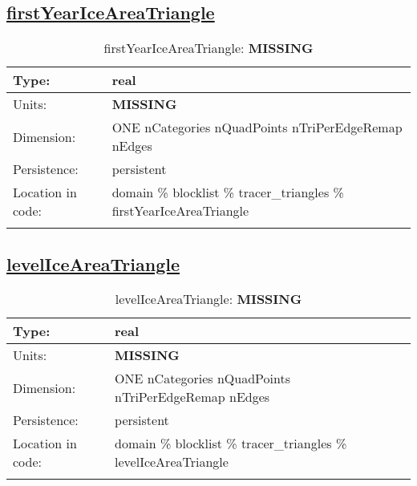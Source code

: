 \subsection[firstYearIceAreaTriangle]{\hyperref[sec:var_tab_tracer_triangles]{firstYearIceAreaTriangle}}
\label{subsec:var_sec_tracer_triangles_firstYearIceAreaTriangle}
\begin{center}
\begin{longtable}{| p{2.0in} | p{4.0in} |}
        \hline 
        Type: & real \\
        \hline 
        Units: & {\bf \color{red} MISSING} \\
        \hline 
        Dimension: & ONE nCategories nQuadPoints nTriPerEdgeRemap nEdges \\
        \hline 
        Persistence: & persistent \\
        \hline 
         Location in code: & domain \% blocklist \% tracer\_triangles \% firstYearIceAreaTriangle \\
         \hline 
    \caption{firstYearIceAreaTriangle: {\bf \color{red} MISSING}}
\end{longtable}
\end{center}
\subsection[levelIceAreaTriangle]{\hyperref[sec:var_tab_tracer_triangles]{levelIceAreaTriangle}}
\label{subsec:var_sec_tracer_triangles_levelIceAreaTriangle}
\begin{center}
\begin{longtable}{| p{2.0in} | p{4.0in} |}
        \hline 
        Type: & real \\
        \hline 
        Units: & {\bf \color{red} MISSING} \\
        \hline 
        Dimension: & ONE nCategories nQuadPoints nTriPerEdgeRemap nEdges \\
        \hline 
        Persistence: & persistent \\
        \hline 
         Location in code: & domain \% blocklist \% tracer\_triangles \% levelIceAreaTriangle \\
         \hline 
    \caption{levelIceAreaTriangle: {\bf \color{red} MISSING}}
\end{longtable}
\end{center}

